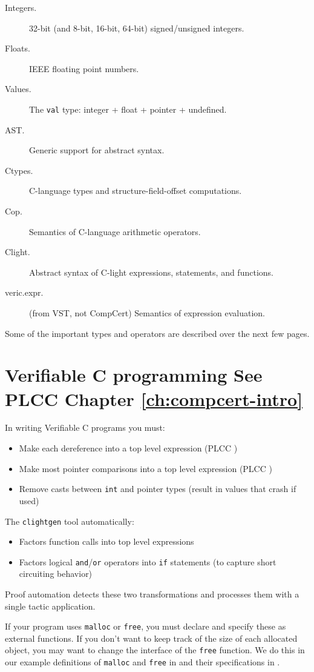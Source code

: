 \documentclass[12pt,fleqn,openany,oneside,showtrims]{memoir}
\newcommand{\ychapter}[2]{\chapter[#1]{#1 \hfill \normalsize #2}}
\begin{document}
\begin{description}
\item[Integers.]  32-bit (and 8-bit, 16-bit, 64-bit) signed/unsigned integers.
\item[Floats.]  IEEE floating point numbers.
\item[Values.]  The \lstinline|val| type: integer + float + pointer + undefined.
\item[AST.]  Generic support for abstract syntax.
\item[Ctypes.]  C-language types and structure-field-offset computations.
\item[Cop.]  Semantics of C-language arithmetic operators.
\item[Clight.]  Abstract syntax of C-light expressions, statements, and functions.
\item[veric.expr.]  (from VST, not CompCert) Semantics of expression evaluation.
\end{description}

Some of the important types and operators are described over the next 
few pages.

\ychapter{Verifiable C programming}{See PLCC Chapter \ref{ch:compcert-intro}}
\label{refcard:verifiable-c}
In writing Verifiable C programs you must:

\begin{itemize}
  \item Make each dereference into a top level expression (PLCC
  )
  \item Make most pointer comparisons into a top level expression (PLCC
  )
  \item Remove casts between \lstinline|int| and pointer types (result in
  values that crash if used)
\end{itemize}

The \lstinline{clightgen} tool automatically:

\begin{itemize}
  \item Factors function calls into top level expressions
  \item Factors logical \lstinline{and}/\lstinline{or} operators into 
\lstinline{if} statements (to capture
  short circuiting behavior)
\end{itemize}

Proof automation detects these two transformations and processes them with a
single tactic application.

If your program uses \lstinline|malloc| or \lstinline|free|, you must declare
and specify these as external functions. If you don't want to keep track of the
size of each allocated object, you may want to change the interface of the
\lstinline|free| function. We do this in our example definitions of
\lstinline|malloc| and \lstinline|free| in  and their
specifications in .
\end{document}
